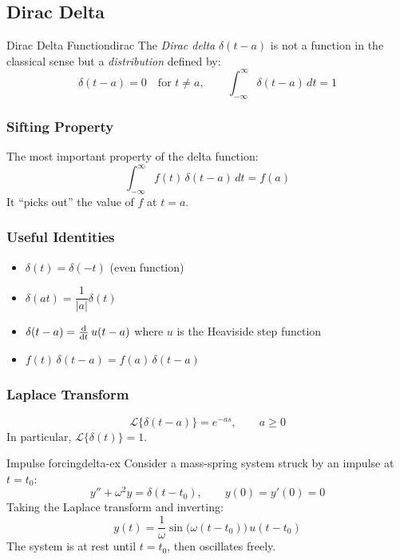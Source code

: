 \documentclass[11pt, letterpaper]{article}
\theoremstyle{plain}
\begin{document}
\subsection{Dirac Delta}

\begin{definition}{Dirac Delta Function}{dirac}
    The \emph{Dirac delta} $\delta(t - a)$ is not a function in the classical
    sense but a \emph{distribution} defined by:
    \[
        \delta(t - a) = 0 \quad \text{for } t \neq a, \qquad
        \int_{-\infty}^{\infty} \delta(t-a)\,dt = 1
    \]
\end{definition}

\subsubsection*{Sifting Property}

The most important property of the delta function:
\[
    \int_{-\infty}^{\infty} f(t)\,\delta(t - a)\,dt = f(a)
\]
It ``picks out'' the value of $f$ at $t = a$.

\subsubsection*{Useful Identities}
\begin{itemize}
    \item $\delta(t) = \delta(-t)$ \quad (even function)
    \item $\delta(at) = \dfrac{1}{|a|}\delta(t)$
    \item $\delta(t-a) = \dv{}{t}\,u(t-a)$ where $u$ is the Heaviside step function
    \item $f(t)\,\delta(t-a) = f(a)\,\delta(t-a)$
\end{itemize}

\subsubsection*{Laplace Transform}
\[
    \mathcal{L}\{\delta(t-a)\} = e^{-as}, \qquad a \geq 0
\]
In particular, $\mathcal{L}\{\delta(t)\} = 1$.

\begin{example}{Impulse forcing}{delta-ex}
    Consider a mass-spring system struck by an impulse at $t = t_0$:
    \[
        y'' + \omega^2 y = \delta(t - t_0), \qquad y(0) = y'(0) = 0
    \]
    Taking the Laplace transform and inverting:
    \[
        y(t) = \frac{1}{\omega}\sin\bigl(\omega(t - t_0)\bigr)\,u(t - t_0)
    \]
    The system is at rest until $t = t_0$, then oscillates freely.
\end{example}
\end{document}
